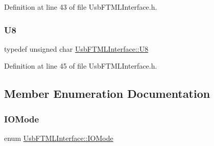 Definition at line 43 of file Usb\+F\+T\+M\+L\+Interface.\+h.

\mbox{\label{classUsbFTMLInterface_af7c9f02ee6f59fefa68ef14f90dcbbd8}} 
\subsubsection{\texorpdfstring{U8}{U8}}
{\footnotesize\ttfamily typedef unsigned char \hyperlink{classUsbFTMLInterface_af7c9f02ee6f59fefa68ef14f90dcbbd8}{Usb\+F\+T\+M\+L\+Interface\+::\+U8}}



Definition at line 45 of file Usb\+F\+T\+M\+L\+Interface.\+h.



\subsection{Member Enumeration Documentation}
\mbox{\label{classUsbFTMLInterface_a181227ebb27454964e5b6d185432498d}} 
\subsubsection{\texorpdfstring{I\+O\+Mode}{IOMode}}
{\footnotesize\ttfamily enum \hyperlink{classUsbFTMLInterface_a181227ebb27454964e5b6d185432498d}{Usb\+F\+T\+M\+L\+Interface\+::\+I\+O\+Mode}}

